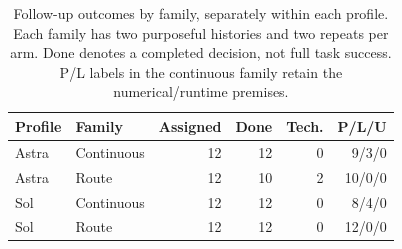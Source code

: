 \begin{table}[htbp]
\centering\small
\begin{tabular}{llrrrr}\toprule
Profile & Family & Assigned & Done & Tech. & P/L/U\\\midrule
Astra & Continuous & 12 & 12 & 0 & 9/3/0\\
Astra & Route & 12 & 10 & 2 & 10/0/0\\
Sol & Continuous & 12 & 12 & 0 & 8/4/0\\
Sol & Route & 12 & 12 & 0 & 12/0/0\\
\bottomrule
\end{tabular}
\caption{Follow-up outcomes by family, separately within each profile. Each family has two purposeful histories and two repeats per arm. Done denotes a completed decision, not full task success. P/L labels in the continuous family retain the numerical/runtime premises.}
\label{tab:followup-families}
\end{table}
